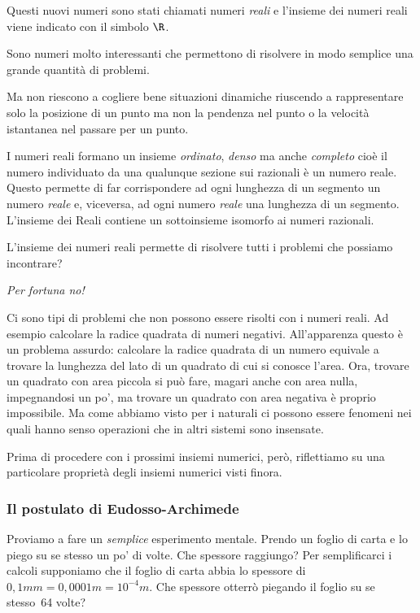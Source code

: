 Questi nuovi numeri sono stati chiamati numeri \emph{reali} e l'insieme dei 
numeri reali viene indicato con il simbolo \(\R\).

Sono numeri molto interessanti che permettono di risolvere in modo semplice 
una grande quantità di problemi.

Ma non riescono a cogliere bene situazioni dinamiche riuscendo a 
rappresentare solo la posizione di un punto ma non la pendenza nel punto o la 
velocità istantanea nel passare per un punto.

I numeri reali formano un insieme \emph{ordinato}, \emph{denso} ma anche 
\emph{completo} cioè il numero individuato da una qualunque sezione sui 
razionali è un numero reale.
Questo permette di far corrispondere ad ogni lunghezza di un segmento 
un numero \emph{reale} e, viceversa, ad ogni numero \emph{reale} una 
lunghezza di un segmento. 
L'insieme dei Reali contiene un sottoinsieme isomorfo ai numeri 
razionali.

L'insieme dei numeri reali permette di risolvere tutti i problemi che 
possiamo incontrare?
\vspace{-1em}
\begin{center} \emph{Per fortuna no!} \end{center}
\vspace{-.5em}
Ci sono tipi di problemi che non possono essere risolti con i numeri reali.
Ad esempio calcolare la radice quadrata di numeri negativi. 
All'apparenza questo è un problema assurdo: calcolare la 
radice quadrata di un numero equivale a trovare la lunghezza del lato di un 
quadrato di cui si conosce l'area. 
Ora, trovare un quadrato con area piccola si può fare, magari anche con 
area nulla, impegnandosi un po', ma trovare un quadrato con area negativa 
è proprio impossibile. 
Ma come abbiamo visto per i naturali ci possono essere fenomeni nei quali 
hanno senso operazioni che in altri sistemi sono insensate.

Prima di procedere con i prossimi insiemi numerici, però, riflettiamo su 
una particolare proprietà degli insiemi numerici visti finora.

\subsubsection{Il postulato di Eudosso-Archimede}

Proviamo a fare un \emph{semplice} esperimento mentale. Prendo un foglio di 
carta e lo piego su se stesso un po' di volte. Che spessore raggiungo?
Per semplificarci i calcoli supponiamo che il foglio di carta abbia lo 
spessore di \(0,1mm = 0,0001m = 10^{-4}m\). 
Che spessore otterrò piegando il foglio su se stesso~64 volte?

